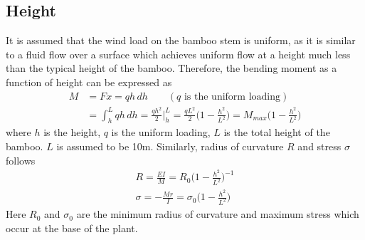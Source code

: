 \documentclass[openright,twoside]{iitkthesis}
\begin{document}
\subsection{Height}
It is assumed that the wind load on the bamboo stem is uniform, as it is similar to a fluid flow over a surface which achieves uniform flow at a height much less than the typical height of the bamboo. Therefore, the bending moment as a function of height can be expressed as
\begin{equation}
\begin{split}
M &= Fx = qh\,dh \qquad (q \text{ is the uniform loading})\\
&= \int_{h}^Lqh\,dh = \frac{qh^2}{2}\bigg|^L_h = \frac{qL^2}{2}\bigg(1-\frac{h^2}{L^2}\bigg) = M_{max}\bigg(1-\frac{h^2}{L^2}\bigg)
\end{split}
\end{equation}
where $h$ is the height, $q$ is the uniform loading, $L$ is the total height of the bamboo. $L$ is assumed to be 10m.
Similarly, radius of curvature $R$ and stress $\sigma$ follows
\begin{eqnarray}
R = \frac{EI}{M} = R_0\bigg(1-\frac{h^2}{L^2}\bigg)^{-1}\\
\sigma = -\frac{Mr}{I} = \sigma_0\bigg(1-\frac{h^2}{L^2}\bigg)
\end{eqnarray}
Here $R_0$ and $\sigma_0$ are the minimum radius of curvature and maximum stress which occur at the base of the plant. 
\end{document}
